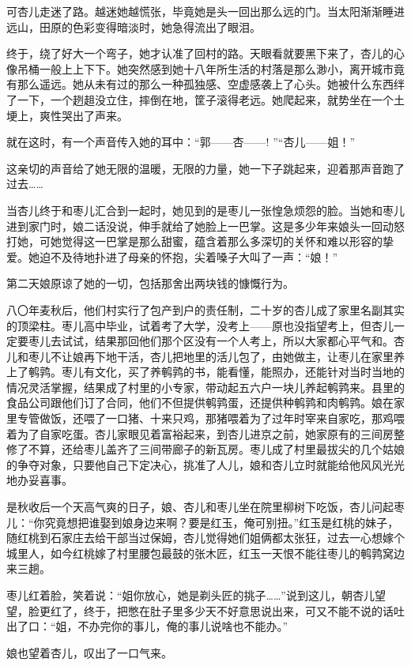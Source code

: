 \par 可杏儿走迷了路。越迷她越慌张，毕竟她是头一回出那么远的门。当太阳渐渐睡进远山，田原的色彩变得暗淡时，她急得流出了眼泪。
\par 终于，绕了好大一个弯子，她才认准了回村的路。天眼看就要黑下来了，杏儿的心像吊桶一般上上下下。她突然感到她十八年所生活的村落是那么渺小，离开城市竟有那么遥远。她从未有过的那么一种孤独感、空虚感袭上了心头。她被什么东西绊了一下，一个趔趄没立住，摔倒在地，筐子滚得老远。她爬起来，就势坐在一个土埂上，爽性哭出了声来。
\par 就在这时，有一个声音传入她的耳中：“郭——杏——! ”“杏儿——姐！”
\par 这亲切的声音给了她无限的温暖，无限的力量，她一下子跳起来，迎着那声音跑了过去……
\par 当杏儿终于和枣儿汇合到一起时，她见到的是枣儿一张惶急烦怨的脸。当她和枣儿进到家门时，娘二话没说，伸手就给了她脸上一巴掌。这是多少年来娘头一回动怒打她，可她觉得这一巴掌是那么甜蜜，蕴含着那么多深切的关怀和难以形容的挚爱。她迫不及待地扑进了母亲的怀抱，尖着嗓子大叫了一声：“娘！”
\par 第二天娘原谅了她的一切，包括那舍出两块钱的慷慨行为。
\par 八〇年麦秋后，他们村实行了包产到户的责任制，二十岁的杏儿成了家里名副其实的顶梁柱。枣儿高中毕业，试着考了大学，没考上——原也没指望考上，但杏儿一定要枣儿去试试，结果那回他们那个区没有一个人考上，所以大家都心平气和。杏儿和枣儿不让娘再下地干活，杏儿把地里的活儿包了，由她做主，让枣儿在家里养上了鹌鹑。枣儿有文化，买了养鹌鹑的书，能看懂，能照办，还能针对当时当地的情况灵活掌握，结果成了村里的小专家，带动起五六户一块儿养起鹌鹑来。县里的食品公司跟他们订了合同，他们不但提供鹌鹑蛋，还提供种鹌鹑和肉鹌鹑。娘在家里专管做饭，还喂了一口猪、十来只鸡，那猪喂着为了过年时宰来自家吃，那鸡喂着为了自家吃蛋。杏儿家眼见着富裕起来，到杏儿进京之前，她家原有的三间房整修了不算，还给枣儿盖齐了三间带廊子的新瓦房。枣儿成了村里最拔尖的几个姑娘的争夺对象，只要他自己下定决心，挑准了人儿，娘和杏儿立时就能给他风风光光地办妥喜事。
\par 是秋收后一个天高气爽的日子，娘、杏儿和枣儿坐在院里柳树下吃饭，杏儿问起枣儿：“你究竟想把谁娶到娘身边来啊？要是红玉，俺可别扭。”红玉是红桃的妹子，随红桃到石家庄去给干部当过保姆，杏儿觉得她们姐俩都太张狂，过去一心想嫁个城里人，如今红桃嫁了村里腰包最鼓的张木匠，红玉一天恨不能往枣儿的鹌鹑窝边来三趟。
\par 枣儿红着脸，笑着说：“姐你放心，她是剃头匠的挑子……”说到这儿，朝杏儿望望，脸更红了，终于，把憋在肚子里多少天不好意思说出来，可又不能不说的话吐出了口：“姐，不办完你的事儿，俺的事儿说啥也不能办。”
\par 娘也望着杏儿，叹出了一口气来。
